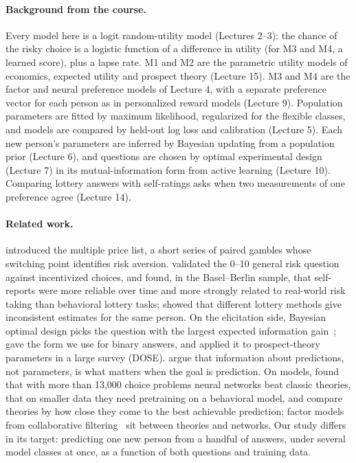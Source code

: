 \documentclass{article}
\begin{document}
\paragraph{Background from the course.} Every model here is a logit random-utility model (Lectures 2--3): the chance of the risky choice is a logistic function of a difference in utility (for M3 and M4, a learned score), plus a lapse rate. M1 and M2 are the parametric utility models of economics, expected utility and prospect theory (Lecture 15). M3 and M4 are the factor and neural preference models of Lecture 4, with a separate preference vector for each person as in personalized reward models (Lecture 9). Population parameters are fitted by maximum likelihood, regularized for the flexible classes, and models are compared by held-out log loss and calibration (Lecture 5). Each new person's parameters are inferred by Bayesian updating from a population prior (Lecture 6), and questions are chosen by optimal experimental design (Lecture 7) in its mutual-information form from active learning (Lecture 10). Comparing lottery answers with self-ratings asks when two measurements of one preference agree (Lecture 14).

\paragraph{Related work.} \citet{holt2002} introduced the multiple price list, a short series of paired gambles whose switching point identifies risk aversion. \citet{dohmen2011} validated the 0--10 general risk question against incentivized choices, and \citet{frey2017} found, in the Basel--Berlin sample, that self-reports were more reliable over time and more strongly related to real-world risk taking than behavioral lottery tasks; \citet{pedroni2017} showed that different lottery methods give inconsistent estimates for the same person. On the elicitation side, Bayesian optimal design picks the question with the largest expected information gain~\citep{chaloner1995}; \citet{houlsby2011} gave the form we use for binary answers, and \citet{chapman2018dose} applied it to prospect-theory parameters in a large survey (DOSE). \citet{bickfordsmith2023} argue that information about predictions, not parameters, is what matters when the goal is prediction. On models, \citet{peterson2021} found that with more than 13,000 choice problems neural networks beat classic theories, \citet{bourgin2019} that on smaller data they need pretraining on a behavioral model, and \citet{fudenberg2022} compare theories by how close they come to the best achievable prediction; factor models from collaborative filtering~\citep{koren2009} sit between theories and networks. Our study differs in its target: predicting one new person from a handful of answers, under several model classes at once, as a function of both questions and training data.
\end{document}
